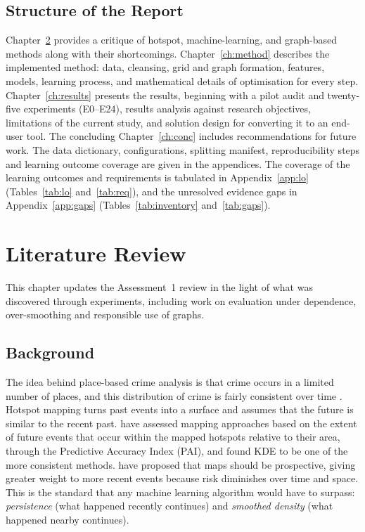 \documentclass[11pt,a4paper]{report}
\begin{document}
\section{Structure of the Report}
Chapter~\ref{ch:lit} provides a critique of hotspot, machine-learning, and graph-based methods along with their shortcomings. Chapter~\ref{ch:method} describes the implemented method: data, cleansing, grid and graph formation, features, models, learning process, and mathematical details of optimisation for every step. Chapter~\ref{ch:results} presents the results, beginning with a pilot audit and twenty-five experiments (E0--E24), results analysis against research objectives, limitations of the current study, and solution design for converting it to an end-user tool. The concluding Chapter~\ref{ch:conc} includes recommendations for future work. The data dictionary, configurations, splitting manifest, reproducibility steps and learning outcome coverage are given in the appendices. The coverage of the learning outcomes and requirements is tabulated in Appendix~\ref{app:lo} (Tables~\ref{tab:lo} and~\ref{tab:req}), and the unresolved evidence gaps in Appendix~\ref{app:gaps} (Tables~\ref{tab:inventory} and~\ref{tab:gaps}).

\chapter{Literature Review}
\label{ch:lit}
This chapter updates the Assessment~1 review in the light of what was discovered through experiments, including work on evaluation under dependence, over-smoothing and responsible use of graphs.

\section{Background}
The idea behind place-based crime analysis is that crime occurs in a limited number of places, and this distribution of crime is fairly consistent over time \citep{weisburd2015}. Hotspot mapping turns past events into a surface and assumes that the future is similar to the recent past. \citet{chainey2008} have assessed mapping approaches based on the extent of future events that occur within the mapped hotspots relative to their area, through the Predictive Accuracy Index (PAI), and found KDE to be one of the more consistent methods. \citet{bowers2004} have proposed that maps should be prospective, giving greater weight to more recent events because risk diminishes over time and space. This is the standard that any machine learning algorithm would have to surpass:  \emph{persistence} (what happened recently continues) and \emph{smoothed density} (what happened nearby continues).
\end{document}
